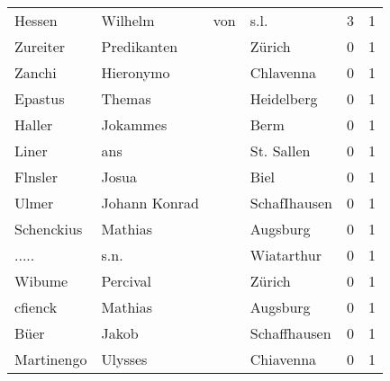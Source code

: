 \begin{tabular}{llllrr}
                   Hessen &                            Wilhelm &         von &                                        s.l. &          3 &         1 \\
                 Zureiter &                        Predikanten &             &                                      Zürich &          0 &         1 \\
                   Zanchi &                          Hieronymo &             &                                   Chlavenna &          0 &         1 \\
                  Epastus &                             Themas &             &                                  Heidelberg &          0 &         1 \\
                   Haller &                           Jokammes &             &                                        Berm &          0 &         1 \\
                    Liner &                                ans &             &                                  St. Sallen &          0 &         1 \\
                  Flnsler &                              Josua &             &                                        Biel &          0 &         1 \\
                    Ulmer &                      Johann Konrad &             &                                SchafIhausen &          0 &         1 \\
               Schenckius &                            Mathias &             &                                    Augsburg &          0 &         1 \\
                    ..... &                               s.n. &             &                                  Wiatarthur &          0 &         1 \\
                   Wibume &                           Percival &             &                                      Zürich &          0 &         1 \\
                  cfienck &                            Mathias &             &                                    Augsburg &          0 &         1 \\
                     Büer &                              Jakob &             &                                Schaffhausen &          0 &         1 \\
               Martinengo &                            Ulysses &             &                                   Chiavenna &          0 &         1 \\

\end{tabular}
